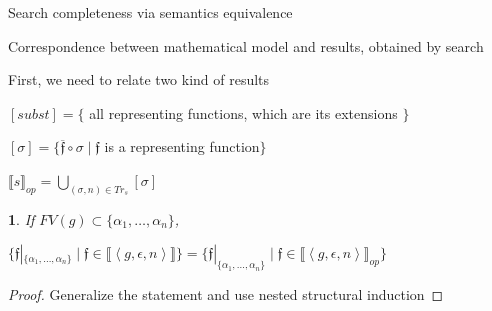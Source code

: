 \documentclass{beamer}
\let\\\tabularnewline
\let\\\tabularnewline
\newcommand{\sembr}[1]{\llbracket{#1}\rrbracket}
\newcommand{\inbr}[1]{\left<{#1}\right>}
\theoremstyle{definition}
\theoremstyle{plain} %
\newcommand{\thistheoremname}{}
\newtheorem{genericthm}[thm]{\thistheoremname}
\newenvironment{namedthm}[1]
  {\renewcommand{\thistheoremname}{#1}%
   \begin{genericthm}}
  {\end{genericthm}}
\begin{document}
\begin{frame}{Search completeness via semantics equivalence}

Correspondence between mathematical model and results, \\ obtained by search

\vskip5mm

First, we need to relate two kind of results

\begin{center}
$[ subst ] = \{$ all representing functions, which are its extensions $\}$

\vskip3mm

$ [\sigma] = \{ \overline{\mathfrak f} \circ \sigma \mid {\mathfrak f}$ is a representing function$\}$

\vskip5mm

$\llbracket s \rrbracket_{op} = \bigcup\limits_{(\sigma, n) \in Tr_s} [\sigma]$
\end{center}

\begin{namedthm}{Interleaving search soundness and completeness}
If $FV(g) \subset \{\alpha_1,\dots,\alpha_n\}$,

$
\{ \mathfrak{f}|_{\{\alpha_1,\dots,\alpha_n\}} \mid \mathfrak{f} \in \sembr{\inbr{g, \epsilon, n}} \}
=
\{\mathfrak{f}|_{\{\alpha_1,\dots,\alpha_n\}} \mid \mathfrak{f} \in \sembr{\inbr{g, \epsilon, n}}_{op} \}
$
\end{namedthm}
\begin{proof}
Generalize the statement and use nested structural induction
\end{proof}

\end{frame}
\end{document}
